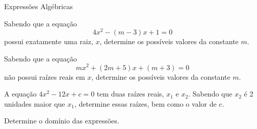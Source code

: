 \begin{exercicios}{Expressões Algébricas}
    \begin{exercicio}
        Sabendo que a equação \[4x^2 -(m-3)x + 1 = 0\] possui exatamente uma raiz, $x$, 
        determine os possíveis valores da constante $m$.
    \end{exercicio}

    \begin{exercicio}
        Sabendo que a equação \[mx^2 +(2m+5)x+(m+3) = 0\] não possui raízes reais em $x$, 
        determine os possíveis valores da constante $m$.
    \end{exercicio}
    
    \begin{exercicio}
        A equação $4x^2 -12x + c = 0$ tem duas raízes reais, $x_1$ e $x_2$. 
        Sabendo que $x_2$ é 2 unidades maior que $x_1$, determine essas raízes, bem como o valor de $c$.
    \end{exercicio}
    
    
    
    \begin{exercicio}
        Determine o domínio das expressões.
        \begin{mathlist}[2]
            \item {}
            \item {}
            \item {}
            \item {}
            \item {}
            \item {}
            \item {}
            \item {}
            \item {}
            \item {}
            \item {}
            \item {}
            \item {}
        \end{mathlist}
    \end{exercicio}
    
    
    

\end{exercicios}
